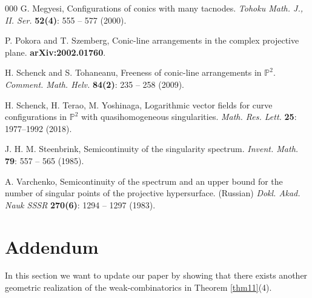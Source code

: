 \documentclass[12pt]{amsart}
\theoremstyle{plain}
\theoremstyle{definition}
\numberwithin{equation}{section}
\newcommand{\PP}{\mathbb{P}}
\begin{document}
\begin{thebibliography}{000}
G. Megyesi, Configurations of conics with many tacnodes. \textit{Tohoku Math. J., II. Ser.} \textbf{52(4)}: 555 -- 577 (2000). 

P. Pokora and T. Szemberg, Conic-line arrangements in the complex projective plane. \textbf{arXiv:2002.01760}.

H. Schenck and S. Tohaneanu, Freeness of conic-line arrangements in $\mathbb{P}^{2}$. \textit{Comment. Math. Helv.} \textbf{84(2)}: 235 -- 258 (2009).

 H. Schenck, H. Terao, M. Yoshinaga,
Logarithmic vector fields for curve configurations in $\PP^2$ with quasihomogeneous singularities. \textit{Math. Res. Lett.}
\textbf{25}: 1977--1992 (2018).

J. H. M. Steenbrink, Semicontinuity of the singularity spectrum. \textit{Invent. Math.} \textbf{79}: 557 -- 565 (1985).

A. Varchenko,  Semicontinuity of the spectrum and an upper bound for the number of singular points of the projective hypersurface. (Russian) \textit{Dokl. Akad. Nauk SSSR} \textbf{270(6)}: 1294 -- 1297 (1983).

\end{thebibliography}
\section{Addendum}
In this section we want to update our paper by showing that there exists another geometric realization of the weak-combinatorics in Theorem \ref{thm11}(4).
\end{document}
